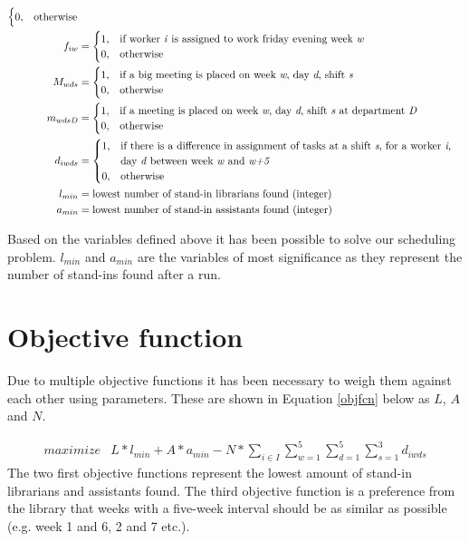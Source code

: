 \begin{align}
\begin{cases}
 		0, & \text{otherwise}
	\end{cases}
	\\
	f_{iw}&=
	\begin{cases}
 		1, & \text{if worker \textit{i} is assigned to work friday evening week \textit{w}} \\
 		0, & \text{otherwise}
	\end{cases}	
	\\
	M_{wds}&=
	\begin{cases}
	 	1, & \text{if a big meeting is placed on week \textit{w}, day \textit{d}, shift \textit{s}} \\
	 	0, & \text{otherwise}
	\end{cases}
	\\
	m_{wdsD}&=
	\begin{cases}
	 	1, & \text{if a meeting is placed on week \textit{w}, day \textit{d}, shift \textit{s} at department \textit{D}} \\
	 	0, & \text{otherwise}
	\end{cases}
	\\
	d_{iwds}&=
	\begin{cases}
	 	1, & \text{if there is a difference in assignment of tasks at a shift \textit{s}, for a worker \textit{i},}\\
	 		& \text{day \textit{d} between week \textit{w} and \textit{w+5}} \\
	 	0, & \text{otherwise}
	\end{cases}
	\\
	l_{min}&= \text{lowest number of stand-in librarians found (integer)} \\
	a_{min}&= \text{lowest number of stand-in assistants found (integer)} \\
\end{align}

Based on the variables defined above it has been possible to solve our scheduling problem. \textit{$l_{min}$} and \textit{$a_{min}$} are the variables of most significance as they represent the number of stand-ins found after a run. 

\section{Objective function} \label{section:obj}
Due to multiple objective functions it has been necessary to weigh them against each other using parameters. These are shown in Equation \ref{objfcn} below as $L$, $A$ and $N$.

\begin{equation} \label{objfcn}
\begin{aligned}
maximize & L*l_{min} + A*a_{min} - N*\sum_{i \in I}\sum_{w = 1}^{5}\sum_{d = 1}^{5}\sum_{s = 1}^{3} d_{iwds}
\end{aligned}
\end{equation}
The two first objective functions represent the lowest amount of stand-in librarians and assistants found. The third objective function is a preference from the library that weeks with a five-week interval should be as similar as possible (e.g. week 1 and 6, 2 and 7 etc.).

